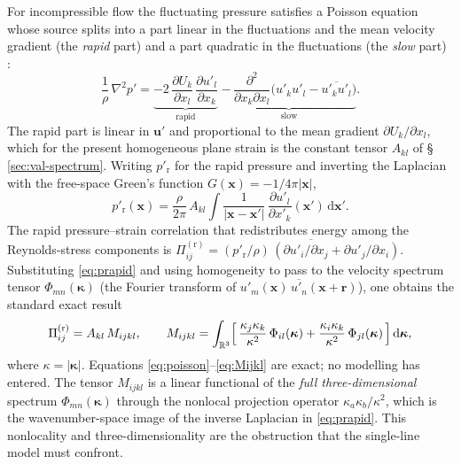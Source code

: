 \documentclass[lineno]{JFM-FLM_Au}
\begin{document}
For incompressible flow the fluctuating pressure satisfies a Poisson equation
whose source splits into a part linear in the fluctuations and the mean
velocity gradient (the \emph{rapid} part) and a part quadratic in the
fluctuations (the \emph{slow} part) \citep{Pope2000}:
\begin{equation}
  \frac{1}{\rho}\,\nabla^2 p'
  = \underbrace{-2\,\frac{\partial U_k}{\partial x_l}\,
      \frac{\partial u'_l}{\partial x_k}}_{\text{rapid}}
    \;\underbrace{-\,\frac{\partial^2}{\partial x_k\partial x_l}
      \bigl(u'_k u'_l - \overline{u'_k u'_l}\bigr)}_{\text{slow}} .
  \label{eq:poisson-rapid}
\end{equation}
The rapid part is linear in $\boldsymbol{u}'$ and proportional to the mean
gradient $\partial U_k/\partial x_l$, which for the present homogeneous plane
strain is the constant tensor $A_{kl}$ of \S\,\ref{sec:val-spectrum}. Writing
$p'_{\mathrm r}$ for the rapid pressure and inverting the Laplacian with the
free-space Green's function $G(\boldsymbol{x})=-1/4\pi|\boldsymbol{x}|$,
\begin{equation}
  p'_{\mathrm r}(\boldsymbol{x})
  = \frac{\rho}{2\pi}\,A_{kl}\!\int
    \frac{1}{|\boldsymbol{x}-\boldsymbol{x}'|}\,
    \frac{\partial u'_l}{\partial x'_k}(\boldsymbol{x}')\,
    \mathrm{d}\boldsymbol{x}' .
  \label{eq:prapid}
\end{equation}
The rapid pressure--strain correlation that redistributes energy among the
Reynolds-stress components is
$\Pi^{(\mathrm r)}_{ij}
   = \overline{(p'_{\mathrm r}/\rho)\,(\partial u'_i/\partial x_j
     + \partial u'_j/\partial x_i)}$.
Substituting \eqref{eq:prapid} and using homogeneity to pass to the
velocity spectrum tensor
$\Phi_{mn}(\boldsymbol{\kappa})$
(the Fourier transform of $\overline{u'_m(\boldsymbol{x})\,
u'_n(\boldsymbol{x}+\boldsymbol{r})}$),
one obtains the standard exact result
\citep{BatchelorProudman1954,Crow1968,HuntCarruthers1990}
\begin{equation}
  \Pi^{(\mathrm r)}_{ij}
  = A_{kl}\,M_{ijkl},
  \qquad
  M_{ijkl}
  = \int_{\mathbb{R}^3}
    \Bigl[\,
      \frac{\kappa_j\kappa_k}{\kappa^2}\,\Phi_{il}(\boldsymbol{\kappa})
      + \frac{\kappa_i\kappa_k}{\kappa^2}\,\Phi_{jl}(\boldsymbol{\kappa})
    \,\Bigr]\,\mathrm{d}\boldsymbol{\kappa},
  \label{eq:Mijkl}
\end{equation}
where $\kappa=|\boldsymbol{\kappa}|$. Equations
\eqref{eq:poisson}--\eqref{eq:Mijkl} are exact; no modelling has entered. The
tensor $M_{ijkl}$ is a linear functional of the \emph{full three-dimensional}
spectrum $\Phi_{mn}(\boldsymbol{\kappa})$ through the nonlocal projection
operator $\kappa_a\kappa_b/\kappa^2$, which is the wavenumber-space image of
the inverse Laplacian in \eqref{eq:prapid}. This nonlocality and
three-dimensionality are the obstruction that the single-line model must
confront.
\end{document}
